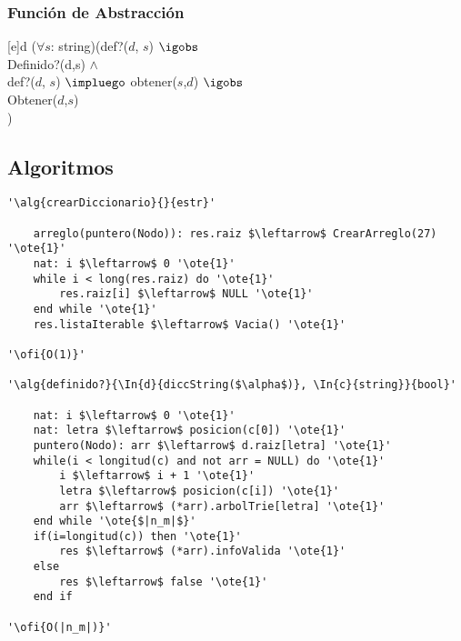 
\pagebreak

\subsubsection{Funci\'on de Abstracci\'on}

[e]{d}{
($\forall s$: string)(def?($d$, $s$) $\igobs$ \\ Definido?(d,s)
\- $\land$ \\
\- def?($d$, $s$) $\impluego$ obtener($s$,$d$) $\igobs$ \\
\- Obtener($d$,$s$) \\
)
}

\subsection{Algoritmos}

\lstset{style=alg}

\begin{lstlisting}[mathescape]
'\alg{crearDiccionario}{}{estr}'
	
    arreglo(puntero(Nodo)): res.raiz $\leftarrow$ CrearArreglo(27) '\ote{1}'
	nat: i $\leftarrow$ 0 '\ote{1}' 
    while i < long(res.raiz) do '\ote{1}'
    	res.raiz[i] $\leftarrow$ NULL '\ote{1}'
    end while '\ote{1}'
    res.listaIterable $\leftarrow$ Vacia() '\ote{1}'

'\ofi{O(1)}'

'\alg{definido?}{\In{d}{diccString($\alpha$)}, \In{c}{string}}{bool}'

	nat: i $\leftarrow$ 0 '\ote{1}'
	nat: letra $\leftarrow$ posicion(c[0]) '\ote{1}'
	puntero(Nodo): arr $\leftarrow$ d.raiz[letra] '\ote{1}'
	while(i < longitud(c) and not arr = NULL) do '\ote{1}'
		i $\leftarrow$ i + 1 '\ote{1}'
		letra $\leftarrow$ posicion(c[i]) '\ote{1}'
		arr $\leftarrow$ (*arr).arbolTrie[letra] '\ote{1}'
	end while '\ote{$|n_m|$}'
	if(i=longitud(c)) then '\ote{1}'
		res $\leftarrow$ (*arr).infoValida '\ote{1}'
	else
		res $\leftarrow$ false '\ote{1}'
	end if
	
'\ofi{O(|n_m|)}'

\end{lstlisting}

